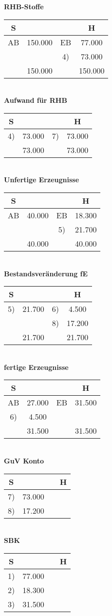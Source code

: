 \documentclass[paper=a4, fontsize=11pt]{scrartcl}
\numberwithin{equation}{section}
\numberwithin{figure}{section}
\numberwithin{table}{section}
\begin{document}
\textbf{RHB-Stoffe}
\begin{tabular}{cc|cc}
S & & & H \\\hline
AB & 150.000 & EB & 77.000 \\
  & & 4) & 73.000 \\\hline
  & 150.000 & & 150.000 \\\hline
\end{tabular} \\
\textbf{Aufwand für RHB}
\begin{tabular}{cc|cc}
S & & & H \\\hline
4) & 73.000 & 7) & 73.000 \\\hline
  & 73.000 & & 73.000 \\\hline
\end{tabular} \\
\textbf{Unfertige Erzeugnisse}
\begin{tabular}{cc|cc}
S & & & H \\\hline
AB & 40.000 & EB & 18.300 \\
  & & 5) & 21.700 \\\hline
  & 40.000 & & 40.000 \\\hline
\end{tabular} \\
\textbf{Bestandsveränderung fE}
\begin{tabular}{cc|cc}
S & & & H \\\hline
5) & 21.700 & 6) & 4.500 \\
  & & 8) & 17.200 \\\hline
  & 21.700 & & 21.700 \\\hline
\end{tabular} \\
\textbf{fertige Erzeugnisse}
\begin{tabular}{cc|cc}
S & & & H \\\hline
AB & 27.000 & EB & 31.500 \\
6) & 4.500 & & \\\hline
  & 31.500 & & 31.500 \\\hline
\end{tabular} \\
\textbf{GuV Konto}
\begin{tabular}{cc|cc}
S & & & H \\\hline
7) & 73.000 & & \\
8) & 17.200 & & \\\hline
\end{tabular} \\
\textbf{SBK}
\begin{tabular}{cc|cc}
S & & & H \\\hline
1) & 77.000 & & \\
2) & 18.300 & & \\
3) & 31.500 & & \\\hline
\end{tabular} \\
\end{document}
